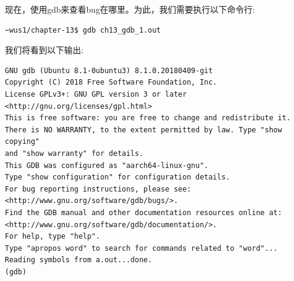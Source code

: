 现在，使用gdb来查看bug在哪里。为此，我们需要执行以下命令行: \par
\begin{lstlisting}[caption={}]
~wus1/chapter-13$ gdb ch13_gdb_1.out
\end{lstlisting}

我们将看到以下输出: \par
\begin{lstlisting}[caption={}]
GNU gdb (Ubuntu 8.1-0ubuntu3) 8.1.0.20180409-git
Copyright (C) 2018 Free Software Foundation, Inc.
License GPLv3+: GNU GPL version 3 or later
<http://gnu.org/licenses/gpl.html>
This is free software: you are free to change and redistribute it.
There is NO WARRANTY, to the extent permitted by law. Type "show copying"
and "show warranty" for details.
This GDB was configured as "aarch64-linux-gnu".
Type "show configuration" for configuration details.
For bug reporting instructions, please see:
<http://www.gnu.org/software/gdb/bugs/>.
Find the GDB manual and other documentation resources online at:
<http://www.gnu.org/software/gdb/documentation/>.
For help, type "help".
Type "apropos word" to search for commands related to "word"...
Reading symbols from a.out...done.
(gdb)
\end{lstlisting}

